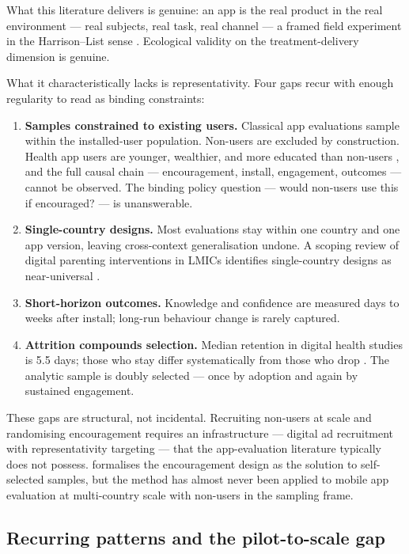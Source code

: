 What this literature delivers is genuine: an app is the real product in the real environment --- real subjects, real task, real channel --- a framed field experiment in the Harrison--List sense \citep{Harrison2004}. Ecological validity on the treatment-delivery dimension is genuine.

What it characteristically lacks is representativity. Four gaps recur with enough regularity to read as binding constraints:

\begin{enumerate}[leftmargin=*]
    \item \textbf{Samples constrained to existing users.} Classical app evaluations sample within the installed-user population. Non-users are excluded by construction. Health app users are younger, wealthier, and more educated than non-users \citep{Carroll}, and the full causal chain --- encouragement, install, engagement, outcomes --- cannot be observed. The binding policy question --- would non-users use this if encouraged? --- is unanswerable.
    \item \textbf{Single-country designs.} Most evaluations stay within one country and one app version, leaving cross-context generalisation undone. A scoping review of digital parenting interventions in LMICs identifies single-country designs as near-universal \citep{Jaggi2025}.
    \item \textbf{Short-horizon outcomes.} Knowledge and confidence are measured days to weeks after install; long-run behaviour change is rarely captured.
    \item \textbf{Attrition compounds selection.} Median retention in digital health studies is 5.5 days; those who stay differ systematically from those who drop \citep{Pratap2019}. The analytic sample is doubly selected --- once by adoption and again by sustained engagement.
\end{enumerate}

These gaps are structural, not incidental. Recruiting non-users at scale and randomising encouragement requires an infrastructure --- digital ad recruitment with representativity targeting --- that the app-evaluation literature typically does not possess. \citet{Bradlow1998} formalises the encouragement design as the solution to self-selected samples, but the method has almost never been applied to mobile app evaluation at multi-country scale with non-users in the sampling frame.

\subsection{Recurring patterns and the pilot-to-scale gap}
\label{sec:intro:patterns}

